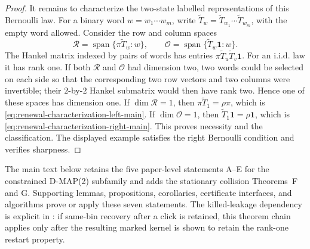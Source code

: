 \begin{proof}
It remains to characterize the two-state labelled representations of this
Bernoulli law.  For a binary word \(w=w_1\cdots w_m\), write
\(\widetilde T_w=\widetilde T_{w_1}\cdots\widetilde T_{w_m}\), with the
empty word allowed.  Consider the row and column spaces
\[
 \mathcal R=\operatorname{span}\{\pi\widetilde T_w:w\},
 \qquad
 \mathcal O=\operatorname{span}\{\widetilde T_w\mathbf1:w\}.
\]
The Hankel matrix indexed by pairs of words has entries
\(\pi\widetilde T_u\widetilde T_v\mathbf1\).  For an i.i.d. law it has rank
one.  If both \(\mathcal R\) and \(\mathcal O\) had dimension two, two words
could be selected on each side so that the corresponding two row vectors and
two columns were invertible; their \(2\)-by-\(2\) Hankel submatrix would then
have rank two.  Hence one of these spaces has dimension one.  If
\(\dim\mathcal R=1\), then
\(\pi\widetilde T_1=\rho\pi\), which is
\eqref{eq:renewal-characterization-left-main}.  If
\(\dim\mathcal O=1\), then
\(\widetilde T_1\mathbf1=\rho\mathbf1\), which is
\eqref{eq:renewal-characterization-right-main}.  This proves necessity and
the classification.  The displayed example satisfies the right Bernoulli
condition and verifies sharpness.
\end{proof}

The main text below retains the five paper-level statements A--E for the
constrained D-MAP(2) subfamily and adds the stationary collision Theorems~F
and G.  Supporting lemmas, propositions, corollaries, certificate interfaces,
and algorithms prove or apply these seven statements.  The killed-leakage dependency is
explicit in : if same-bin
recovery after a click is retained, this theorem chain applies only after the
resulting marked kernel is shown to retain the rank-one restart property.

